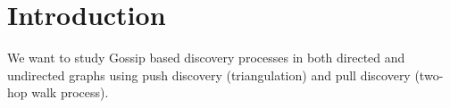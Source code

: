 \documentclass[
10pt, %
a4paper, %
oneside, %
headinclude,footinclude, %
BCOR5mm, %
]{scrartcl}
\title{\normalfont\spacedallcaps{Discovery Through Gossip}} %
\author{\spacedlowsmallcaps{Mohammad Mahzoun}} %
\date{\today} %
\begin{document}

\renewcommand{\sectionmark}[1]{\markright{\spacedlowsmallcaps{#1}}} %
\lehead{\mbox{\llap{\small\thepage\kern1em\color{halfgray} \vline}\color{halfgray}\hspace{0.5em}\rightmark\hfil}} %

\pagestyle{scrheadings} %


\maketitle %

\setcounter{tocdepth}{2} %

\tableofcontents %

\listoffigures %

\listoftables %


\newpage %


\section{Introduction}
We want to study Gossip based discovery processes in both directed and undirected graphs using push discovery (triangulation) and pull discovery (two-hop walk process).
\end{document}
